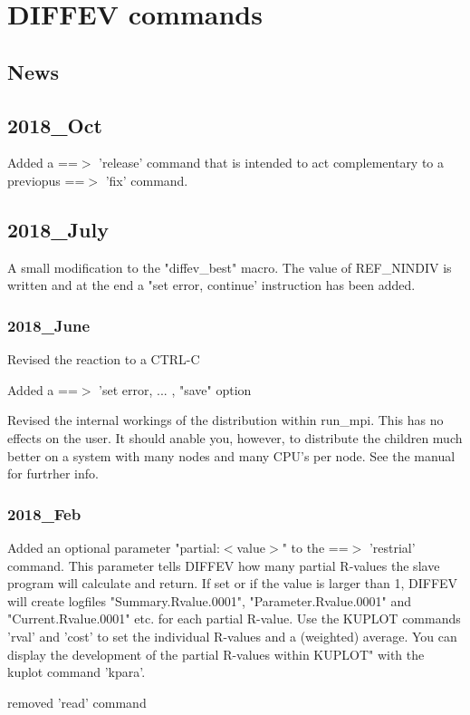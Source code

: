 \chapter{DIFFEV commands}
\section{News}
\section{2018\_Oct}
\par
Added a ==$> $ 'release' command that is intended to act 
complementary to a previopus ==$> $ 'fix' command. 
\section{2018\_July}
\par
A small modification to the "diffev\_best" macro. 
The value of REF\_NINDIV is written and at the end a 
"set error, continue' instruction has been added. 
\subsection*{2018\_June}
\par
Revised the reaction to a CTRL-C 
\par
Added a ==$> $ 'set error, ... , "save" option 
\par
Revised the internal workings of the distribution within 
run\_mpi. This has no effects on the user. It should anable you, 
however, to distribute the children much better on a system with 
many nodes and many CPU's per node. See the manual for furtrher info. 
\subsection*{2018\_Feb}
\par
Added an optional parameter "partial:$ <$value$> $" to the 
==$> $ 'restrial' command. This parameter tells DIFFEV how many 
partial R-values the slave program will calculate and return. 
If set or if the value is larger than 1, DIFFEV will create 
logfiles "Summary.Rvalue.0001", "Parameter.Rvalue.0001" and 
"Current.Rvalue.0001" etc. for each partial R-value. 
Use the KUPLOT commands 'rval' and 'cost' to set the 
individual R-values and a (weighted) average. 
You can display the development of the partial R-values within 
KUPLOT" with the kuplot command 'kpara'. 
\par
removed 'read' command 
